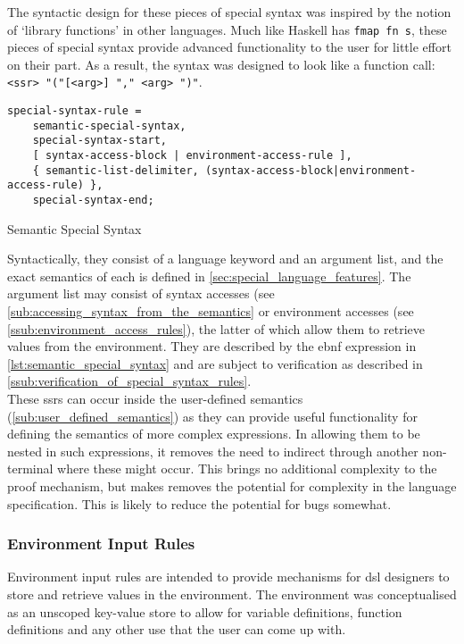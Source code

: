 The syntactic design for these pieces of special syntax was inspired by the notion of `library functions' in other languages.
Much like Haskell has \texttt{fmap fn s}, these pieces of special syntax provide advanced functionality to the user for little effort on their part.
As a result, the syntax was designed to look like a function call: \texttt{<ssr> "("[<arg>] {"," <arg>} ")"}.\\

\begin{listing}[!htb]
\begin{verbatim}
special-syntax-rule = 
    semantic-special-syntax,
    special-syntax-start,
    [ syntax-access-block | environment-access-rule ],
    { semantic-list-delimiter, (syntax-access-block|environment-access-rule) },
    special-syntax-end;
\end{verbatim}
\caption{Semantic Special Syntax}
\label{lst:semantic_special_syntax}
\end{listing}

Syntactically, they consist of a language keyword and an argument list, and the exact semantics of each is defined in \autoref{sec:special_language_features}.
The argument list may consist of syntax accesses (see \autoref{sub:accessing_syntax_from_the_semantics} or environment accesses (see \autoref{ssub:environment_access_rules}), the latter of which allow them to retrieve values from the environment.
They are described by the \gls{ebnf} expression in \autoref{lst:semantic_special_syntax} and are subject to verification as described in \autoref{ssub:verification_of_special_syntax_rules}.\\

These \glspl{ssr} can occur inside the user-defined semantics (\autoref{sub:user_defined_semantics}) as they can provide useful functionality for defining the semantics of more complex expressions.
In allowing them to be nested in such expressions, it removes the need to indirect through another non-terminal where these might occur. 
This brings no additional complexity to the proof mechanism, but makes removes the potential for complexity in the language specification.
This is likely to reduce the potential for bugs somewhat. 


\subsubsection{Environment Input Rules} %
\label{ssub:environment_input_rules}
Environment input rules are intended to provide mechanisms for \gls{dsl} designers to store and retrieve values in the environment. 
The environment was conceptualised as an unscoped key-value store to allow for variable definitions, function definitions and any other use that the user can come up with. \\

